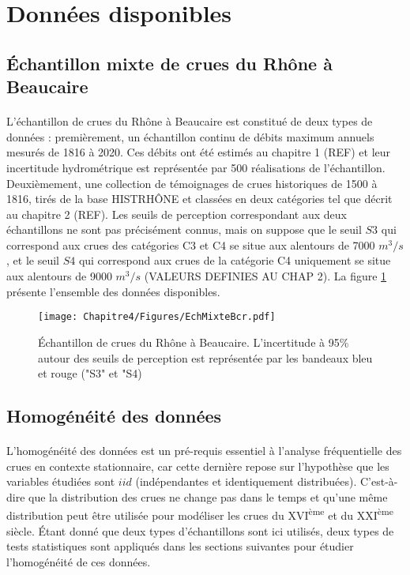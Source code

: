 		
\section{Données disponibles}
\label{sec:dataBcr}

	\subsection{Échantillon mixte de crues du Rhône à Beaucaire}
	\paragraph{} L'échantillon de crues du Rhône à Beaucaire est constitué de deux types de données : premièrement, un échantillon continu de débits maximum annuels mesurés de 1816 à 2020. Ces débits ont été estimés au chapitre 1 (REF) et leur incertitude hydrométrique est représentée par 500 réalisations de l'échantillon. Deuxièmement, une collection de témoignages de crues historiques de 1500 à 1816, tirés de la base HISTRHÔNE et classées en deux catégories tel que décrit au chapitre 2 (REF). Les seuils de perception correspondant aux deux échantillons ne sont pas précisément connus, mais on suppose que le seuil $S3$ qui correspond aux crues des catégories C3 et C4 se situe aux alentours de 7000 $m^3/s$, et le seuil $S4$ qui correspond aux crues de la catégorie C4 uniquement se situe aux alentours de 9000 $m^3/s$ (VALEURS DEFINIES AU CHAP 2). La figure \ref{fig:EchMixte} présente l'ensemble des données disponibles. 
	
	\begin{figure}[h]
		\texttt{[image: Chapitre4/Figures/EchMixteBcr.pdf]}	
		\caption{Échantillon de crues du Rhône à Beaucaire. L'incertitude à 95\% autour des seuils de perception est représentée par les bandeaux bleu et rouge ("S3" et "S4)}
		\label{fig:EchMixte}
	\end{figure}
	

	\subsection{Homogénéité des données}
	\label{subsec:homog}
	\paragraph{} L'homogénéité des données est un pré-requis essentiel à l'analyse fréquentielle des crues en contexte stationnaire, car cette dernière repose sur l'hypothèse que les variables étudiées sont $iid$ (indépendantes et identiquement distribuées). C'est-à-dire que la distribution des crues ne change pas dans le temps et qu'une même distribution peut être utilisée pour modéliser les crues du XVI\textsuperscript{ème} et du XXI\textsuperscript{ème} siècle. Étant donné que deux types d'échantillons sont ici utilisés, deux types de tests statistiques sont appliqués dans les sections suivantes pour étudier l'homogénéité de ces données. 

